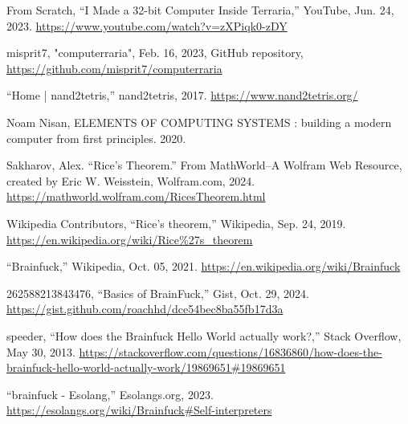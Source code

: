 \documentclass[12pt]{report} %
\begin{document}
\begin{singlespace}
\begin{thebibliography}{}
             From Scratch, “I Made a 32-bit Computer Inside Terraria,” YouTube, Jun. 24, 2023. \href{https://www.youtube.com/watch?v=zXPiqk0-zDY}{https://www.youtube.com/watch?v=zXPiqk0-zDY}

             misprit7, "computerraria", Feb. 16, 2023, GitHub repository, \href{https://github.com/misprit7/computerraria}{https://github.com/misprit7/computerraria}
            
             “Home | nand2tetris,” nand2tetris, 2017. \href{https://www.nand2tetris.org/}{https://www.nand2tetris.org/}

             Noam Nisan, ELEMENTS OF COMPUTING SYSTEMS : building a modern computer from first principles. 2020.


             Sakharov, Alex. “Rice’s Theorem.” From MathWorld--A Wolfram Web Resource, created by Eric W. Weisstein, Wolfram.com, 2024. \href{https://mathworld.wolfram.com/RicesTheorem.html}{https://mathworld.wolfram.com/RicesTheorem.html}
            
             Wikipedia Contributors, “Rice’s theorem,” Wikipedia, Sep. 24, 2019. \href{https://en.wikipedia.org/wiki/Rice%27s_theorem}{https://en.wikipedia.org/wiki/Rice\%27s\_theorem}
            
             “Brainfuck,” Wikipedia, Oct. 05, 2021. \href{https://en.wikipedia.org/wiki/Brainfuck}{https://en.wikipedia.org/wiki/Brainfuck}
            
             262588213843476, “Basics of BrainFuck,” Gist, Oct. 29, 2024. \href{https://gist.github.com/roachhd/dce54bec8ba55fb17d3a}{https://gist.github.com/roachhd/dce54bec8ba55fb17d3a}

             speeder, “How does the Brainfuck Hello World actually work?,” Stack Overflow, May 30, 2013. \href{https://stackoverflow.com/questions/16836860/how-does-the-brainfuck-hello-world-actually-work/19869651#19869651}{https://stackoverflow.com/questions/16836860/how-does-the-brainfuck-hello-world-actually-work/19869651\#19869651}
                        
             “brainfuck - Esolang,” Esolangs.org, 2023. \href{https://esolangs.org/wiki/Brainfuck#Self-interpreters}{https://esolangs.org/wiki/Brainfuck\#Self-interpreters}
            

\end{thebibliography}
\end{singlespace}
\end{document}
